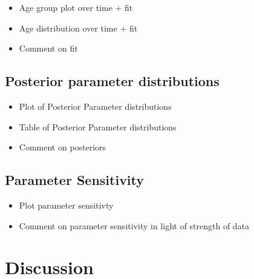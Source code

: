 \documentclass[11pt,twoside]{bristolthesis}
\providecommand{\tightlist}{%
  \setlength{\itemsep}{0pt}\setlength{\parskip}{0pt}}
\begin{document}
  \begin{itemize}
  \tightlist
  \item
    Age group plot over time + fit
  \item
    Age distribution over time + fit
  \item
    Comment on fit
  \end{itemize}
  \hypertarget{posterior-parameter-distributions}{%
  \subsection{Posterior parameter distributions}\label{posterior-parameter-distributions}}
  \begin{itemize}
  \tightlist
  \item
    Plot of Posterior Parameter distributions
  \item
    Table of Posterior Parameter distributions
  \item
    Comment on posteriors
  \end{itemize}
  \hypertarget{parameter-sensitivity-1}{%
  \subsection{Parameter Sensitivity}\label{parameter-sensitivity-1}}
  \begin{itemize}
  \tightlist
  \item
    Plot parameter sensitivty
  \item
    Comment on parameter sensitivity in light of strength of data
  \end{itemize}
  \hypertarget{discussion-5}{%
  \section{Discussion}\label{discussion-5}}
  
\end{document}
